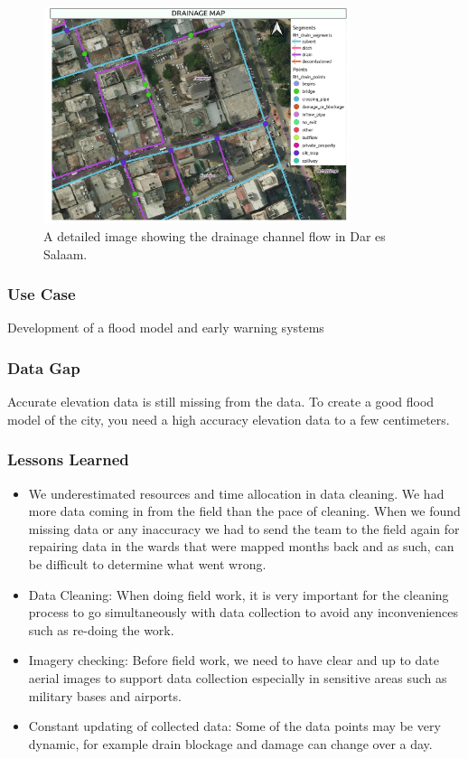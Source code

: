 \documentclass[a4paper,12pt,twoside]{article}
\begin{document}
\begin{figure}[h]
 \color{RHgreen}\caption{A detailed image showing the drainage channel flow in Dar es Salaam.}
  \includegraphics[width=0.8\textwidth]{images/Drainage_Visualization.jpeg}
\end{figure}

\subsubsection{Use Case}
Development of a flood model and early warning systems

\subsubsection{Data Gap}
Accurate elevation data is still missing from the data. To create a good flood model of the city, you need a high accuracy elevation data to a few centimeters.

\subsubsection{Lessons Learned}
\begin{itemize}
    
\item {\color {RHblue}{Field work outpacing data cleaning and analysis:}}
We underestimated resources and time allocation in data cleaning. We had more data coming in from the field than the pace of cleaning. When we found missing data or any inaccuracy we had to send the team to the field again for repairing data in the wards that were mapped months back and as such, can be difficult to determine what went wrong. 
\item {\color {RHblue} {Data Cleaning:}}
When doing field work, it is very important for the cleaning process to go simultaneously with data collection to avoid any inconveniences such as re-doing the work.
\item{\color {RHblue} {Imagery checking:}}
Before field work, we need to have clear and up to date aerial images to support data collection especially in sensitive areas such as military bases and airports.
\item {\color {RHblue} {Constant updating of collected data:}} Some of the data points may be very dynamic, for example drain blockage and damage can change over a day.
\end{itemize}
\end{document}
